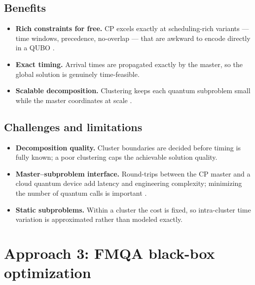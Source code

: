 \documentclass[11pt]{article}
\begin{document}
\subsection{Benefits}
\begin{itemize}[leftmargin=1.4em]
  \item \textbf{Rich constraints for free.} CP excels exactly at scheduling-rich variants
        --- time windows, precedence, no-overlap --- that are awkward to encode directly in
        a QUBO \cite{aguiar2015time}.
  \item \textbf{Exact timing.} Arrival times are propagated exactly by the master, so the
        global solution is genuinely time-feasible.
  \item \textbf{Scalable decomposition.} Clustering keeps each quantum subproblem small
        while the master coordinates at scale \cite{feld2019hybrid}.
\end{itemize}

\subsection{Challenges and limitations}
\begin{itemize}[leftmargin=1.4em]
  \item \textbf{Decomposition quality.} Cluster boundaries are decided before timing is
        fully known; a poor clustering caps the achievable solution quality.
  \item \textbf{Master--subproblem interface.} Round-trips between the CP master and a
        cloud quantum device add latency and engineering complexity; minimizing the number
        of quantum calls is important \cite{holliday2025advanced}.
  \item \textbf{Static subproblems.} Within a cluster the cost is fixed, so intra-cluster
        time variation is approximated rather than modeled exactly.
\end{itemize}

\section{Approach 3: FMQA black-box optimization}
\label{sec:approach3}
\end{document}
